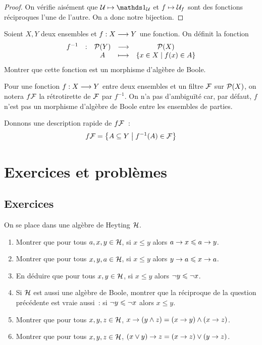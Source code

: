 \begin{proof}
  On vérifie aisément que $\varUlF \mapsto \indicP{\varUlF}$ et
  $f\mapsto \mathcal{U}_f$ sont des fonctions réciproques l'une de l'autre.
  On a donc notre bijection.
\end{proof}

\begin{exercise}
  Soient $X,Y$ deux ensembles et $f : \displaystyle X \longrightarrow Y$ une fonction. On
  définit la fonction
  \[
  \makeFun{f^{-1}}{\powerset(Y)}{\powerset(X)}
          {\varPt}{\compr{x \in X}{f(x)\in \varPt}}
  \]
  Montrer que cette fonction est un morphisme d'algèbre de Boole.
\end{exercise}

\begin{notation}
  Pour une fonction $f : \displaystyle X \longrightarrow Y$ entre deux ensembles et un filtre
  $\mathcal{F}$ sur $\mathcal{P}(X)$, on notera $f\mathcal{F}$ la rétrotirette de
  $\mathcal{F}$ par $f^{-1}$. On n'a pas d'ambiguïté car, par défaut, $f$ n'est pas
  un morphisme d'algèbre de Boole entre les ensembles de parties.

  Donnons une description rapide de $f\mathcal{F}$~:
  \[f\mathcal{F} = \left\{ A \subseteq Y \;\middle\vert\; f^{-1}(A) \in \mathcal{F} \right\}\]
\end{notation}

\clearpage

\section{Exercices et problèmes}

\subsection{Exercices}

\begin{exercise}
  On se place dans une algèbre de Heyting $\mathcal{H}$.
  \begin{enumerate}[label=(\roman*)]
  \item Montrer que pour tous $a,x,y \in \mathcal{H}$, si $x \leq y$ alors
    $a \to x \leqslant a \to y$.
  \item Montrer que pour tous $x,y,a \in \mathcal{H}$, si $x \leq y$ alors
    $y \to a \leqslant x \to a$.
  \item En déduire que pour tous $x,y \in \mathcal{H}$, si $x \leq y$ alors
    $\lnot y \leqslant \lnot x$.
  \item Si $\mathcal{H}$ est aussi une algèbre de Boole, montrer que la
    réciproque de la question précédente est vraie aussi~: si
    $\lnot y \leqslant \lnot x$ alors $x \leq y$.
  \item Montrer que pour tous $x,y,z \in \mathcal{H}$,
    $x \to (y \wedge z) = (x \to y) \wedge (x \to z)$.
  \item Montrer que pour tous $x,y,z \in \mathcal{H}$,
    $(x\vee y) \to z = (x \to z) \vee (y \to z)$.
  \end{enumerate}
\end{exercise}

